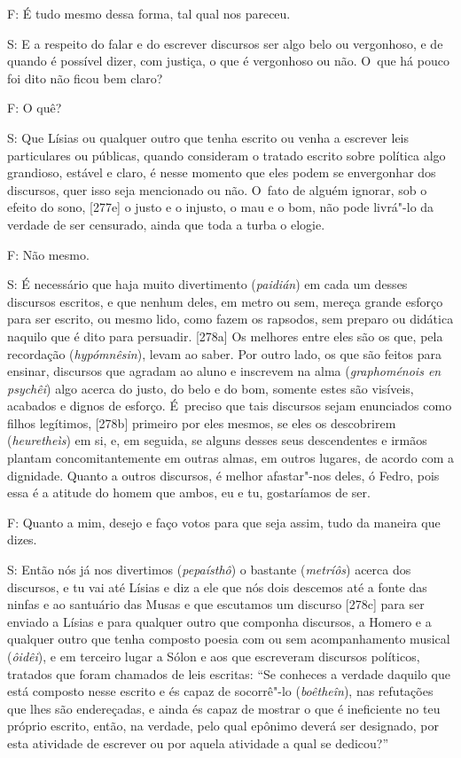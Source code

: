  

F: É tudo mesmo dessa forma, tal qual nos pareceu.

 

S: E a respeito do falar e do escrever discursos ser algo belo ou
vergonhoso, e de quando é possível dizer, com justiça, o que é
vergonhoso ou não. O~que há pouco foi dito não ficou bem claro?

 

F: O quê?

 

S: Que Lísias ou qualquer outro que tenha escrito ou venha a escrever
leis particulares ou públicas, quando consideram o tratado escrito sobre
política algo grandioso, estável e claro, é nesse momento que eles podem
se envergonhar dos discursos, quer isso seja mencionado ou não. O~fato
de alguém ignorar, sob o efeito do sono, [277e] o justo e o injusto,
o mau e o bom, não pode livrá"-lo da verdade de ser censurado, ainda que
toda a turba o elogie.

 

F: Não mesmo.

 

S: É necessário que haja muito divertimento (\emph{paidián}) em cada um
desses discursos escritos, e que nenhum deles, em metro ou sem, mereça
grande esforço para ser escrito, ou mesmo lido, como fazem os rapsodos,
sem preparo ou didática naquilo que é dito para persuadir. [278a] Os
melhores entre eles são os que, pela recordação (\emph{hypómnêsin}),
levam ao saber. Por outro lado, os que são feitos para ensinar,
discursos que agradam ao aluno e inscrevem na alma (\emph{graphoménois
en psychêi}) algo acerca do justo, do belo e do bom, somente estes são
visíveis, acabados e dignos de esforço. É~preciso que tais discursos
sejam enunciados como filhos legítimos, [278b] primeiro por eles
mesmos, se eles os descobrirem (\emph{heuretheìs}) em si, e, em seguida,
se alguns desses seus descendentes e irmãos plantam concomitantemente em
outras almas, em outros lugares, de acordo com a dignidade. Quanto a
outros discursos, é melhor afastar"-nos deles, ó Fedro, pois essa é a
atitude do homem que ambos, eu e tu, gostaríamos de ser.

 

F: Quanto a mim, desejo e faço votos para que seja assim, tudo da
maneira que dizes.

 

S: Então nós já nos divertimos (\emph{pepaísthô}) o bastante
(\emph{metríôs}) acerca dos discursos, e tu vai até Lísias e diz a ele
que nós dois descemos até a fonte das ninfas e ao santuário das Musas e
que escutamos um discurso [278c] para ser enviado a Lísias e para
qualquer outro que componha discursos, a Homero e a qualquer outro que
tenha composto poesia com ou sem acompanhamento musical (\emph{ôidêi}),
e em terceiro lugar a Sólon e aos que escreveram discursos políticos,
tratados que foram chamados de leis escritas: ``Se conheces a verdade
daquilo que está composto nesse escrito e és capaz de socorrê"-lo
(\emph{boêtheîn}), nas refutações que lhes são endereçadas, e ainda és
capaz de mostrar o que é ineficiente no teu próprio escrito, então, na
verdade, pelo qual epônimo deverá ser designado, por esta atividade de
escrever ou por aquela atividade a qual se dedicou?''


